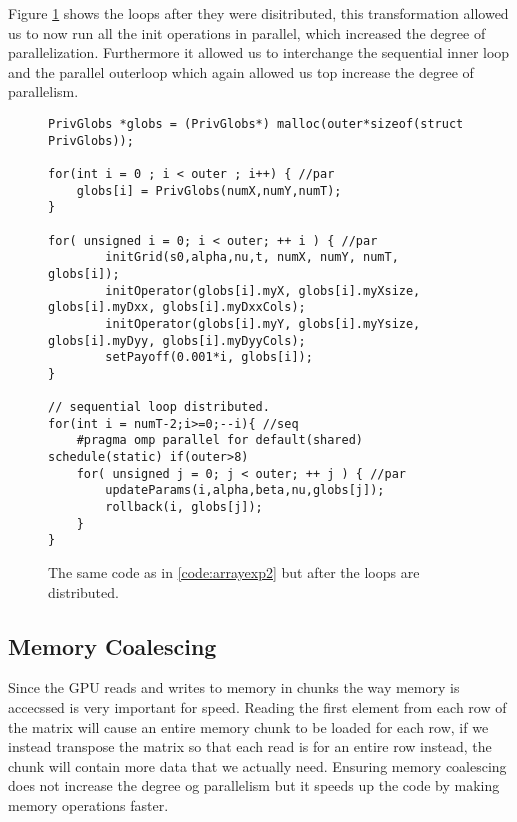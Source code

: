 Figure \ref{code:arrayexp3} shows the loops after they were disitributed, this
transformation allowed us to now run all the init operations in parallel, which
increased the degree of parallelization. Furthermore it allowed us to
interchange the sequential inner loop and the parallel outerloop which again
allowed us top increase the degree of parallelism.

\begin{figure}[H]
    \begin{lstlisting}
PrivGlobs *globs = (PrivGlobs*) malloc(outer*sizeof(struct PrivGlobs));

for(int i = 0 ; i < outer ; i++) { //par
    globs[i] = PrivGlobs(numX,numY,numT);
}

for( unsigned i = 0; i < outer; ++ i ) { //par
        initGrid(s0,alpha,nu,t, numX, numY, numT, globs[i]);
        initOperator(globs[i].myX, globs[i].myXsize, globs[i].myDxx, globs[i].myDxxCols);
        initOperator(globs[i].myY, globs[i].myYsize, globs[i].myDyy, globs[i].myDyyCols);
        setPayoff(0.001*i, globs[i]);
}

// sequential loop distributed.
for(int i = numT-2;i>=0;--i){ //seq
    #pragma omp parallel for default(shared) schedule(static) if(outer>8)
    for( unsigned j = 0; j < outer; ++ j ) { //par
        updateParams(i,alpha,beta,nu,globs[j]);
        rollback(i, globs[j]);
    }
}
    \end{lstlisting}
    \caption{The same code as in \ref{code:arrayexp2} but after the loops are
    distributed.}
    \label{code:arrayexp3}
\end{figure}

\subsection{Memory Coalescing}

Since the GPU reads and writes to memory in chunks the way memory is accecssed
is very important for speed. Reading the first element from each row of the
matrix will cause an entire memory chunk to be loaded for each row, if we
instead transpose the matrix so that each read is for an entire row instead, the
chunk will contain more data that we actually need. Ensuring memory coalescing
does not increase the degree og parallelism but it speeds up the code by making
memory operations faster.


